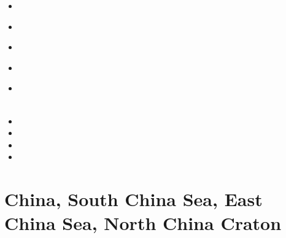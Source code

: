 \begin{small}
\begin{itemize}
\item[\nineteeneighty]
\item[\nineteenninetythree]
 \\ 
\item[\nineteenninetyeight]
\item[\nineteenninetynine]
 \\
\item[\twothousandten]
 \\
 \\
\item[\twothousandthirteen]
\item[\twothousandthirteen]
\item[\twothousandtwenty]
\item[\twothousandtwentythree]
\end{itemize}
\end{small}

\section{China, South China Sea, East China Sea, North China Craton}

